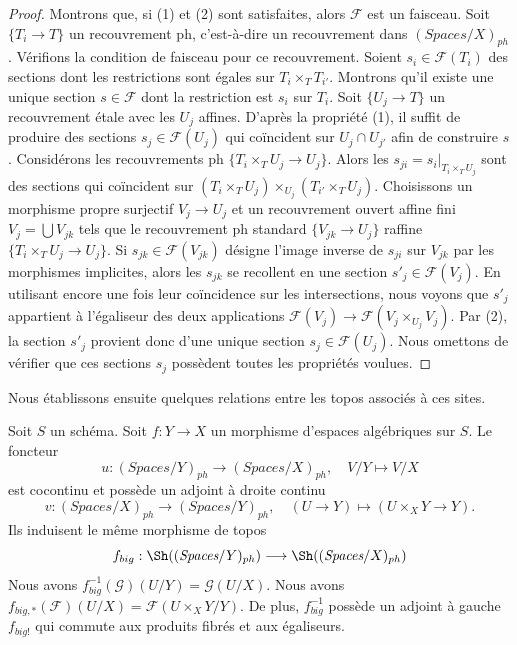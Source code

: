 \begin{proof}
Montrons que, si (1) et (2) sont satisfaites, alors $\mathcal{F}$ est un faisceau.
Soit $\{T_i \to T\}$ un recouvrement ph, c'est-à-dire un recouvrement dans
$(\textit{Spaces}/X)_{ph}$.
Vérifions la condition de faisceau pour ce recouvrement.
Soient $s_i \in \mathcal{F}(T_i)$ des sections dont les restrictions sont égales
sur $T_i \times_T T_{i'}$. Montrons qu'il existe une
unique section $s \in \mathcal{F}$ dont la restriction est $s_i$ sur $T_i$.
Soit $\{U_j \to T\}$ un recouvrement \'etale avec les $U_j$ affines.
D'après la propriété (1), il suffit de produire des sections $s_j \in \mathcal{F}(U_j)$
qui coïncident sur $U_j \cap U_{j'}$ afin de construire $s$.
Considérons les recouvrements ph $\{T_i \times_T U_j \to U_j\}$.
Alors les $s_{ji} = s_i|_{T_i \times_T U_j}$ sont des sections qui coïncident
sur $(T_i \times_T U_j) \times_{U_j} (T_{i'} \times_T U_j)$.
Choisissons un morphisme propre surjectif $V_j \to U_j$ et un recouvrement
ouvert affine fini $V_j = \bigcup V_{jk}$ tels que le recouvrement ph standard
$\{V_{jk} \to U_j\}$ raffine $\{T_i \times_T U_j \to U_j\}$.
Si $s_{jk} \in \mathcal{F}(V_{jk})$
désigne l'image inverse de $s_{ji}$ sur $V_{jk}$ par les
morphismes implicites, alors les $s_{jk}$ se recollent en une section
$s'_j \in \mathcal{F}(V_j)$. En utilisant encore une fois leur coïncidence sur les intersections,
nous voyons que $s'_j$ appartient à l'égaliseur des deux
applications $\mathcal{F}(V_j) \to \mathcal{F}(V_j \times_{U_j} V_j)$.
Par (2), la section $s'_j$ provient donc d'une unique section
$s_j \in \mathcal{F}(U_j)$. Nous omettons de vérifier que ces
sections $s_j$ possèdent toutes les propriétés voulues.
\end{proof}

\noindent
Nous établissons ensuite quelques relations entre les topos
associés à ces sites.

\begin{lemma}
\label{lemma-morphism-big-ph}
Soit $S$ un schéma.
Soit $f : Y \to X$ un morphisme d'espaces algébriques sur $S$.
Le foncteur
$$
u : (\textit{Spaces}/Y)_{ph} \longrightarrow (\textit{Spaces}/X)_{ph},
\quad
V/Y \longmapsto V/X
$$
est cocontinu et possède un adjoint à droite continu
$$
v : (\textit{Spaces}/X)_{ph} \longrightarrow (\textit{Spaces}/Y)_{ph},
\quad
(U \to Y) \longmapsto (U \times_X Y \to Y).
$$
Ils induisent le même morphisme de topos
$$
f_{big} :
\Sh((\textit{Spaces}/Y)_{ph})
\longrightarrow
\Sh((\textit{Spaces}/X)_{ph})
$$
Nous avons $f_{big}^{-1}(\mathcal{G})(U/Y) = \mathcal{G}(U/X)$.
Nous avons $f_{big, *}(\mathcal{F})(U/X) = \mathcal{F}(U \times_X Y/Y)$.
De plus, $f_{big}^{-1}$ possède un adjoint à gauche $f_{big!}$ qui commute aux
produits fibrés et aux égaliseurs.
\end{lemma}

